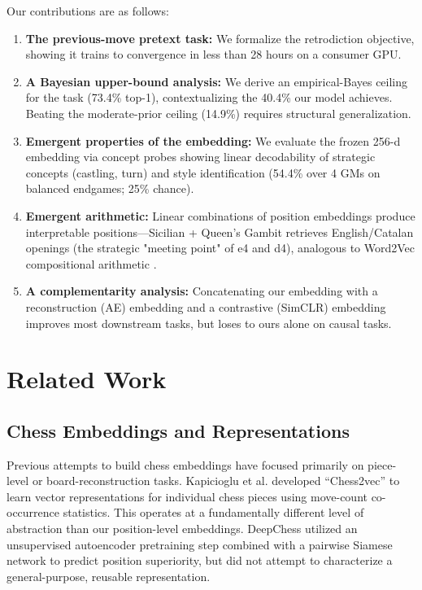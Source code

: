 \documentclass[journal]{IEEEtran}
\begin{document}
Our contributions are as follows:
\begin{enumerate}
    \item \textbf{The previous-move pretext task:} We formalize the retrodiction objective, showing it trains to convergence in less than 28 hours on a consumer GPU.
    \item \textbf{A Bayesian upper-bound analysis:} We derive an empirical-Bayes ceiling for the task (73.4\% top-1), contextualizing the 40.4\% our model achieves. Beating the moderate-prior ceiling (14.9\%) requires structural generalization.
    \item \textbf{Emergent properties of the embedding:} We evaluate the frozen 256-d embedding via concept probes showing linear decodability of strategic concepts (castling, turn) and style identification (54.4\% over 4 GMs on balanced endgames; 25\% chance).
    \item \textbf{Emergent arithmetic:} Linear combinations of position embeddings produce interpretable positions---Sicilian + Queen's Gambit retrieves English/Catalan openings (the strategic "meeting point" of e4 and d4), analogous to Word2Vec compositional arithmetic \cite{ref-mikolov}.
    \item \textbf{A complementarity analysis:} Concatenating our embedding with a reconstruction (AE) embedding and a contrastive (SimCLR) embedding improves most downstream tasks, but loses to ours alone on causal tasks.
\end{enumerate}

\section{Related Work}

\subsection{Chess Embeddings and Representations}
Previous attempts to build chess embeddings have focused primarily on piece-level or board-reconstruction tasks. Kapicioglu et al. \cite{ref-kapicioglu} developed ``Chess2vec'' to learn vector representations for individual chess pieces using move-count co-occurrence statistics. This operates at a fundamentally different level of abstraction than our position-level embeddings. DeepChess \cite{ref-deepchess} utilized an unsupervised autoencoder pretraining step combined with a pairwise Siamese network to predict position superiority, but did not attempt to characterize a general-purpose, reusable representation. 
\end{document}
